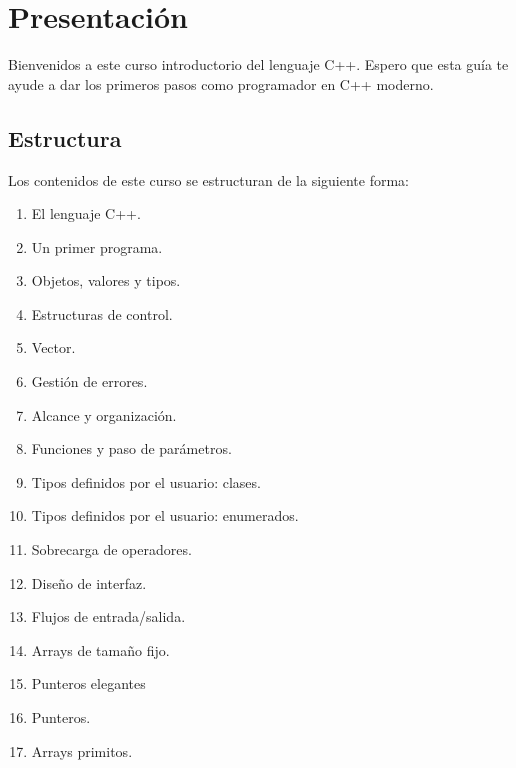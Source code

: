 \chapter*{Presentación}

Bienvenidos a este curso introductorio del lenguaje C++.
Espero que esta guía te ayude a dar los primeros pasos como programador
en C++ moderno.


\section*{Estructura}

Los contenidos de este curso se estructuran de la siguiente forma:

\begin{enumerate}

\item El lenguaje C++.
\item Un primer programa.
\item Objetos, valores y tipos.
\item Estructuras de control.
\item Vector.
\item Gestión de errores.
\item Alcance y organización.
\item Funciones y paso de parámetros.
\item Tipos definidos por el usuario: clases.
\item Tipos definidos por el usuario: enumerados.
\item Sobrecarga de operadores.
\item Diseño de interfaz.
\item Flujos de entrada/salida.
\item Arrays de tamaño fijo.
\item Punteros elegantes
\item Punteros.
\item Arrays primitos.

\end{enumerate}
